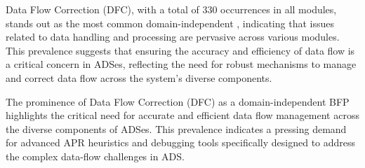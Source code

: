 Data Flow Correction (DFC), with a total of 330 occurrences in all modules, stands out as the most common domain-independent \bfp, indicating that issues related to data handling and processing are pervasive across various modules. 
This prevalence suggests that ensuring the accuracy and efficiency of data flow is a critical concern in ADSes, reflecting the need for robust mechanisms to manage and correct data flow across the system's diverse components. 

\vspace{-1ex}
\begin{finding}
\label{finding:rq5_dfc}
    The prominence of Data Flow Correction (DFC) as a domain-independent BFP highlights the critical need for accurate and efficient data flow management across the diverse components of ADSes. This prevalence indicates a pressing demand for advanced APR heuristics and debugging tools specifically designed to address the complex data-flow challenges in ADS.
\end{finding}
\vspace{-1ex}

